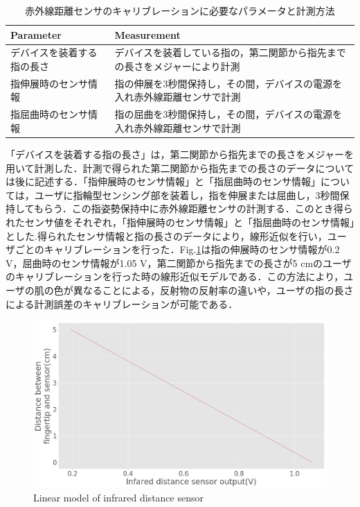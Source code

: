 \begin{table}[H]
  \caption{赤外線距離センサのキャリブレーションに必要なパラメータと計測方法}
  \label{table:cali_inf}
  \centering
  \begin{tabular}{ll}
    \hline
    Parameter &  Measurement  \\
    \hline \hline
デバイスを装着する指の長さ&
デバイスを装着している指の，第二関節から指先までの長さをメジャーにより計測\\

指伸展時のセンサ情報&
指の伸展を3秒間保持し，その間，デバイスの電源を入れ赤外線距離センサで計測\\

指屈曲時のセンサ情報&
指の屈曲を3秒間保持し，その間，デバイスの電源を入れ赤外線距離センサで計測\\

    \hline
  \end{tabular}
\end{table}

「デバイスを装着する指の長さ」は，第二関節から指先までの長さをメジャーを用いて計測した．計測で得られた第二関節から指先までの長さのデータについては後に記述する．「指伸展時のセンサ情報」と「指屈曲時のセンサ情報」については，ユーザに指輪型センシング部を装着し，指を伸展または屈曲し，3秒間保持してもらう．この指姿勢保持中に赤外線距離センサの計測する．このとき得られたセンサ値をそれぞれ，「指伸展時のセンサ情報」と「指屈曲時のセンサ情報」とした.得られたセンサ情報と指の長さのデータにより，線形近似を行い，ユーザごとのキャリブレーションを行った．Fig.\ref{fig:cali_inf}は指の伸展時のセンサ情報が0.2 V，屈曲時のセンサ情報が1.05 V，第二関節から指先までの長さが5 cmのユーザのキャリブレーションを行った時の線形近似モデルである．この方法により，ユーザの肌の色が異なることによる，反射物の反射率の違いや，ユーザの指の長さによる計測誤差のキャリブレーションが可能である．

\begin{figure}[H]
  \centering
  \includegraphics[width=0.8\linewidth]{fig/infrared_linearmodel}
  \caption{Linear model of infrared distance sensor}
  \label{fig:cali_inf} 
\end{figure}

